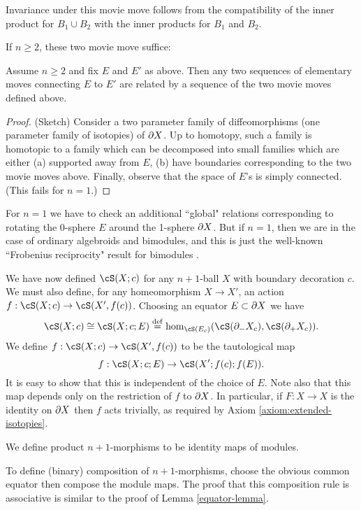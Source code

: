 Invariance under this movie move follows from the compatibility of the inner
product for $B_1\cup B_2$ with the inner products for $B_1$ and $B_2$.


If $n\ge 2$, these two movie move suffice:

\begin{lem}
Assume $n\ge 2$ and fix $E$ and $E'$ as above.
Then any two sequences of elementary moves connecting $E$ to $E'$
are related by a sequence of the two movie moves defined above.
\end{lem}

\begin{proof}
(Sketch)
Consider a two parameter family of diffeomorphisms (one parameter family of isotopies) 
of $\partial X$.
Up to homotopy,
such a family is homotopic to a family which can be decomposed 
into small families which are either
(a) supported away from $E$, 
(b) have boundaries corresponding to the two movie moves above.
Finally, observe that the space of $E$'s is simply connected.
(This fails for $n=1$.)
\end{proof}

For $n=1$ we have to check an additional ``global" relations corresponding to 
rotating the 0-sphere $E$ around the 1-sphere $\partial X$.
But if $n=1$, then we are in the case of ordinary algebroids and bimodules,
and this is just the well-known ``Frobenius reciprocity" result for bimodules \cite{MR1424954}.

\medskip

We have now defined $\cS(X; c)$ for any $n{+}1$-ball $X$ with boundary decoration $c$.
We must also define, for any homeomorphism $X\to X'$, an action $f: \cS(X; c) \to \cS(X', f(c))$.
Choosing an equator $E\subset \partial X$ we have 
\[
	\cS(X; c) \cong \cS(X; c; E) \deq \hom_{\cS(E_c)}(\cS(\bd_-X_c), \cS(\bd_+X_c)) .
\]
We define $f: \cS(X; c) \to \cS(X', f(c))$ to be the tautological map
\[
	f: \cS(X; c; E) \to \cS(X'; f(c); f(E)) .
\]
It is easy to show that this is independent of the choice of $E$.
Note also that this map depends only on the restriction of $f$ to $\partial X$.
In particular, if $F: X\to X$ is the identity on $\partial X$ then $f$ acts trivially, as required by
Axiom \ref{axiom:extended-isotopies}.

We define product $n{+}1$-morphisms to be identity maps of modules.

To define (binary) composition of $n{+}1$-morphisms, choose the obvious common equator
then compose the module maps.
The proof that this composition rule is associative is similar to the proof of Lemma \ref{equator-lemma}.

